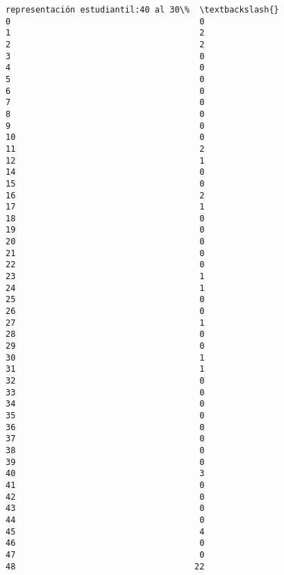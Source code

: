 \documentclass[11pt]{article}
\begin{document}
\begin{Verbatim}[commandchars=\\\{\}]
    representación estudiantil:40 al 30\%  \textbackslash{}
0                                      0   
1                                      2   
2                                      2   
3                                      0   
4                                      0   
5                                      0   
6                                      0   
7                                      0   
8                                      0   
9                                      0   
10                                     0   
11                                     2   
12                                     1   
14                                     0   
15                                     0   
16                                     2   
17                                     1   
18                                     0   
19                                     0   
20                                     0   
21                                     0   
22                                     0   
23                                     1   
24                                     1   
25                                     0   
26                                     0   
27                                     1   
28                                     0   
29                                     0   
30                                     1   
31                                     1   
32                                     0   
33                                     0   
34                                     0   
35                                     0   
36                                     0   
37                                     0   
38                                     0   
39                                     0   
40                                     3   
41                                     0   
42                                     0   
43                                     0   
44                                     0   
45                                     4   
46                                     0   
47                                     0   
48                                    22   


\end{Verbatim}
\end{document}
